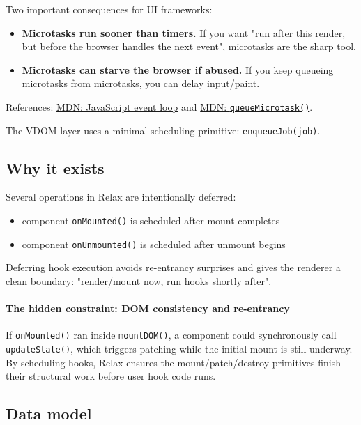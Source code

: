 Two important consequences for UI frameworks:

\begin{itemize}
  \item \textbf{Microtasks run sooner than timers.} If you want "run after this render, but before the browser handles the next event",
    microtasks are the sharp tool.
  \item \textbf{Microtasks can starve the browser if abused.} If you keep queueing microtasks from microtasks,
    you can delay input/paint.
\end{itemize}

References: \href{https://developer.mozilla.org/en-US/docs/Web/JavaScript/Event_loop}{MDN: JavaScript event loop}
and \href{https://developer.mozilla.org/en-US/docs/Web/API/queueMicrotask}{MDN: \texttt{queueMicrotask()}}.

The VDOM layer uses a minimal scheduling primitive: \texttt{enqueueJob(job)}.

\subsection{Why it exists}

Several operations in Relax are intentionally deferred:

\begin{itemize}
  \item component \texttt{onMounted()} is scheduled after mount completes
  \item component \texttt{onUnmounted()} is scheduled after unmount begins
\end{itemize}

Deferring hook execution avoids re-entrancy surprises and gives the renderer a clean boundary: "render/mount now, run hooks shortly after".

\paragraph{The hidden constraint: DOM consistency and re-entrancy}

If \texttt{onMounted()} ran inside \texttt{mountDOM()}, a component could synchronously call \texttt{updateState()}, which triggers patching while the initial mount is still underway.
By scheduling hooks, Relax ensures the mount/patch/destroy primitives finish their structural work before user hook code runs.

\subsection{Data model}


